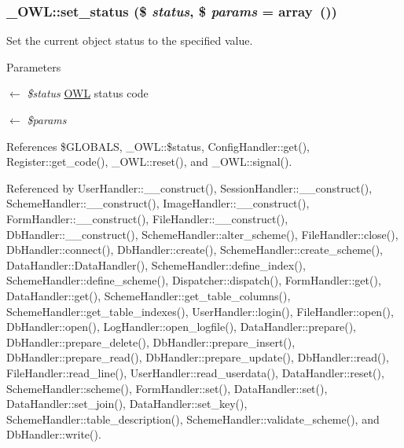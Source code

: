 \subsubsection[{set\_\-status}]{\setlength{\rightskip}{0pt plus 5cm}\_\-OWL::set\_\-status (\$ {\em status}, \/  \$ {\em params} = {\ttfamily array~()})}\label{class__OWL_aea912d0ede9b3c2a69b79072d94d4787}
Set the current object status to the specified value.


\begin{DoxyParams}{Parameters}
\item[\mbox{$\leftarrow$} {\em \$status}]\hyperlink{classOWL}{OWL} status code \item[\mbox{$\leftarrow$} {\em \$params}]\end{DoxyParams}


References \$GLOBALS, \_\-OWL::\$status, ConfigHandler::get(), Register::get\_\-code(), \_\-OWL::reset(), and \_\-OWL::signal().



Referenced by UserHandler::\_\-\_\-construct(), SessionHandler::\_\-\_\-construct(), SchemeHandler::\_\-\_\-construct(), ImageHandler::\_\-\_\-construct(), FormHandler::\_\-\_\-construct(), FileHandler::\_\-\_\-construct(), DbHandler::\_\-\_\-construct(), SchemeHandler::alter\_\-scheme(), FileHandler::close(), DbHandler::connect(), DbHandler::create(), SchemeHandler::create\_\-scheme(), DataHandler::DataHandler(), SchemeHandler::define\_\-index(), SchemeHandler::define\_\-scheme(), Dispatcher::dispatch(), FormHandler::get(), DataHandler::get(), SchemeHandler::get\_\-table\_\-columns(), SchemeHandler::get\_\-table\_\-indexes(), UserHandler::login(), FileHandler::open(), DbHandler::open(), LogHandler::open\_\-logfile(), DataHandler::prepare(), DbHandler::prepare\_\-delete(), DbHandler::prepare\_\-insert(), DbHandler::prepare\_\-read(), DbHandler::prepare\_\-update(), DbHandler::read(), FileHandler::read\_\-line(), UserHandler::read\_\-userdata(), DataHandler::reset(), SchemeHandler::scheme(), FormHandler::set(), DataHandler::set(), DataHandler::set\_\-join(), DataHandler::set\_\-key(), SchemeHandler::table\_\-description(), SchemeHandler::validate\_\-scheme(), and DbHandler::write().

